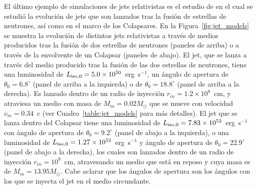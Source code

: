 \documentclass[12pt,a4paper]{book}
\begin{document}
El último ejemplo de simulaciones de jets relativistas es el estudio de \citet{JBEMGRB} en el cual se estudió la evolución de jets que son lanzados tras la fusión de estrellas de neutrones, así como en el  
marco de los Colapsares. En la Figura~\ref{fig:jet_models} se muestra la evolución de distintos jets relativistas a través de medios producidos tras la fusión de dos estrellas de neutrones (paneles de arriba) o 
a través de la envolvente de un Colapsar (paneles de abajo). El jet, que se lanza a través del medio producido tras la fusión de las dos estrellas de neutrones, tiene una luminosidad 
de $L_{\rm iso, 0} = 5.0 \times10^{50}$~erg~s$^{-1}$, un ángulo de apertura de $\theta_0=6.8^{\circ}$ (panel de arriba a la izquierda) o de $\theta_0=18.8^{\circ}$ (panel de arriba a la derecha).
Es lanzado dentro de un radio de inyección $r_{in}=1.2\times10^{8}$~cm, y atraviesa un medio con masa de $M_{m} = 0.02 M_{\odot}$ que se mueve con velocidad $v_{m} = 0.34$~c (ver Cuadro~\ref{table:jet_models} para más detalles). 
El jet que se lanza dentro del Colapsar tiene una luminosidad de $L_{\rm iso, 0} = 7.83 \times10^{52}$~erg~s$^{-1}$ con ángulo de apertura de $\theta_0=9.2^{\circ}$ (panel de abajo a la izquierda), o una 
luminosidad de $L_{\rm iso, 0} = 1.27 \times10^{52}$~erg~s$^{-1}$ y ángulo de apertura de $\theta_0=22.9^{\circ}$ (panel de abajo a la derecha), los cuales son lanzados dentro de un radio de inyección $r_{in}=10^{9}$~cm, 
atravesando un medio que está en reposo y cuya masa es de $M_{m} = 13.95 M_{\odot}$.
Cabe aclarar que los ángulos de apertura son los ángulos con los que se inyecta el jet en el medio circundante.
\end{document}

